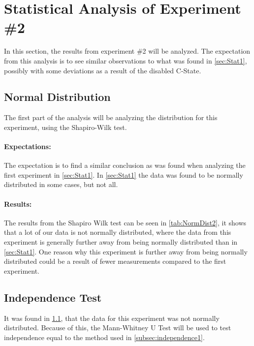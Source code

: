 \section{Statistical Analysis of Experiment \#2}\label{sec:Stat2}
In this section, the results from experiment \#2 will be analyzed. The expectation from this analysis is to see similar observations to what was found in \cref{sec:Stat1}, possibly with some deviations as a result of the disabled C-State. 

\subsection{Normal Distribution}\label{subsec:NormalDist2}

The first part of the analysis will be analyzing the distribution for this experiment, using the Shapiro-Wilk test\cite{razali2011power}.

\paragraph{Expectations:} The expectation is to find a similar conclusion as was found when analyzing the first experiment in \cref{sec:Stat1}. In \cref{sec:Stat1} the data was found to be normally distributed in some cases, but not all.

 


\paragraph{Results:} The results from the Shapiro Wilk test can be seen in \cref{tab:NormDist2}, it shows that a lot of our data is not normally distributed, where the data from this experiment is generally further away from being normally distributed than in \cref{sec:Stat1}. One reason why this experiment is further away from being normally distributed could be a result of fewer measurements compared to the first experiment.

\subsection{Independence Test}\label{subsec:independence2}
It was found in \cref{subsec:NormalDist2}, that the data for this experiment was not normally distributed. Because of this, the Mann-Whitney U Test\cite{mann1947test} will be used to test independence equal to the method used in \cref{subsec:independence1}.

